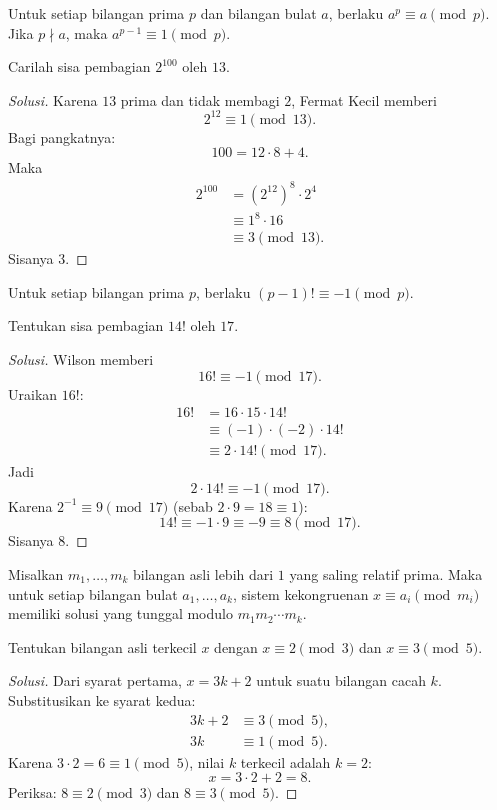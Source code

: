 \documentclass[12pt]{scrartcl}
\begin{document}
\begin{theorem}
Untuk setiap bilangan prima $p$ dan bilangan bulat $a$, berlaku
$a^p \equiv a \pmod{p}$. Jika $p \nmid a$, maka $a^{p-1} \equiv 1 \pmod{p}$.
\end{theorem}

\begin{example}
Carilah sisa pembagian $2^{100}$ oleh $13$.
\end{example}
\begin{proof}[Solusi]
Karena $13$ prima dan tidak membagi $2$, Fermat Kecil memberi
\[ 2^{12} \equiv 1 \pmod{13}. \]
Bagi pangkatnya:
\[ 100 = 12 \cdot 8 + 4. \]
Maka
\begin{align*}
2^{100} &= (2^{12})^8 \cdot 2^4 \\
&\equiv 1^8 \cdot 16 \\
&\equiv 3 \pmod{13}.
\end{align*}
Sisanya $3$.
\end{proof}

\begin{theorem}[Wilson]
Untuk setiap bilangan prima $p$, berlaku $(p-1)! \equiv -1 \pmod{p}$.
\end{theorem}

\begin{example}
Tentukan sisa pembagian $14!$ oleh $17$.
\end{example}
\begin{proof}[Solusi]
Wilson memberi
\[ 16! \equiv -1 \pmod{17}. \]
Uraikan $16!$:
\begin{align*}
16! &= 16 \cdot 15 \cdot 14! \\
&\equiv (-1) \cdot (-2) \cdot 14! \\
&\equiv 2 \cdot 14! \pmod{17}.
\end{align*}
Jadi
\[ 2 \cdot 14! \equiv -1 \pmod{17}. \]
Karena $2^{-1} \equiv 9 \pmod{17}$ (sebab $2 \cdot 9 = 18 \equiv 1$):
\[ 14! \equiv -1 \cdot 9 \equiv -9 \equiv 8 \pmod{17}. \]
Sisanya $8$.
\end{proof}

\begin{theorem}
Misalkan $m_1, \dots, m_k$ bilangan asli lebih dari $1$ yang saling relatif prima.
Maka untuk setiap bilangan bulat $a_1, \dots, a_k$, sistem kekongruenan
$x \equiv a_i \pmod{m_i}$ memiliki solusi yang tunggal modulo $m_1 m_2 \cdots m_k$.
\end{theorem}

\begin{example}
Tentukan bilangan asli terkecil $x$ dengan $x \equiv 2 \pmod{3}$ dan $x \equiv 3 \pmod{5}$.
\end{example}
\begin{proof}[Solusi]
Dari syarat pertama, $x = 3k + 2$ untuk suatu bilangan cacah $k$.
Substitusikan ke syarat kedua:
\begin{align*}
3k + 2 &\equiv 3 \pmod{5}, \\
3k &\equiv 1 \pmod{5}.
\end{align*}
Karena $3 \cdot 2 = 6 \equiv 1 \pmod{5}$, nilai $k$ terkecil adalah $k = 2$:
\[ x = 3 \cdot 2 + 2 = 8. \]
Periksa: $8 \equiv 2 \pmod{3}$ dan $8 \equiv 3 \pmod{5}$.
\end{proof}
\end{document}
